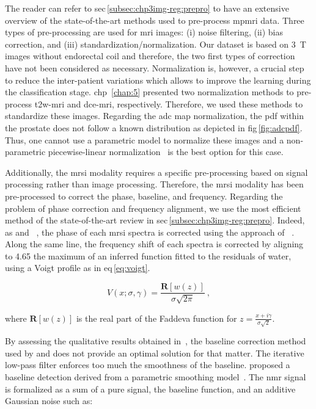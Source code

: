 The reader can refer to \acs{sec}\,\ref{subsec:chp3img-reg:prepro} to have an extensive overview of the state-of-the-art methods used to pre-process \ac{mpmri} data.
Three types of pre-processing are used for \ac{mri} images: (i) noise filtering, (ii) bias correction, and (iii) standardization/normalization.
Our dataset is based on \SI{3}{\tesla} images without endorectal coil and therefore, the two first types of correction have not been considered as necessary.
Normalization is, however, a crucial step to reduce the inter-patient variations which allows to improve the learning during the classification stage.
\Ac{chp}~\ref{chap:5} presented two normalization methods to pre-process \ac{t2w}-\ac{mri} and \ac{dce}-\ac{mri}, respectively.
Therefore, we used these methods to standardize these images.
Regarding the \ac{adc} map normalization, the \ac{pdf} within the prostate does not follow a known distribution as depicted in \acs{fig}\,\ref{fig:adcpdf}.
Thus, one cannot use a parametric model to normalize these images and a non-parametric piecewise-linear normalization~\cite{Nyul2000} is the best option for this case.

Additionally, the \ac{mrsi} modality requires a specific pre-processing based on signal processing rather than image processing.
Therefore, the \ac{mrsi} modality has been pre-processed to correct the phase, baseline, and frequency.
Regarding the problem of phase correction and frequency alignment, we use the most efficient method of the state-of-the-art review in \acs{sec}\,\ref{subsec:chp3img-reg:prepro}.
Indeed, as \citeauthor{Parfait2012} and \citeauthor{trigui2017automatic}~\cite{Parfait2012,trigui2016classification,trigui2017automatic}, the phase of each \ac{mrsi} spectra is corrected using the approach of \citeauthor{Chen2002}~\cite{Chen2002}.
Along the same line, the frequency shift of each spectra is corrected by aligning to \SI{4.65}{\ppm} the maximum of an inferred function fitted to the residuals of water, using a Voigt profile as in \acs{eq}\,\eqref{eq:voigt}.

\begin{equation}
  V(x; \sigma, \gamma) = \frac{\mathbf{R} \left[ w(z) \right]}{\sigma \sqrt{2\pi}} \ ,
  \label{eq:voigt}
\end{equation}

\noindent where $\mathbf{R} \left[ w(z) \right]$ is the real part of the Faddeva function for $z = \frac{x + i \gamma}{\sigma \sqrt{2}}$.

By assessing the qualitative results obtained in~\cite{Parfait2010}, the baseline correction method used by \citeauthor{Parfait2012} and \citeauthor{trigui2017automatic} does not provide an optimal solution for that matter.
The iterative low-pass filter enforces too much the smoothness of the baseline.
\citeauthor{xi2008baseline} proposed a baseline detection derived from a parametric smoothing model~\cite{xi2008baseline}.
The \ac{nmr} signal is formalized as a sum of a pure signal, the baseline function, and an additive Gaussian noise such as:


